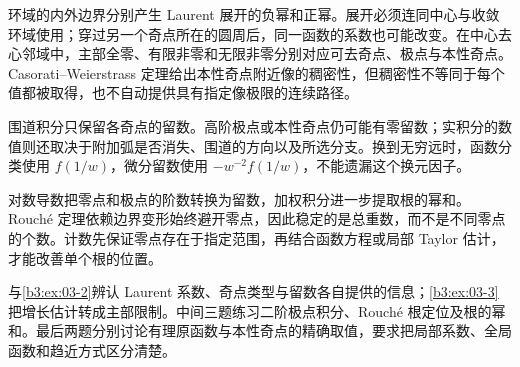 




\begin{chaptersummary}
环域的内外边界分别产生 Laurent 展开的负幂和正幂。展开必须连同中心与收敛环域使用；穿过另一个奇点所在的圆周后，同一函数的系数也可能改变。在中心去心邻域中，主部全零、有限非零和无限非零分别对应可去奇点、极点与本性奇点。Casorati--Weierstrass 定理给出本性奇点附近像的稠密性，但稠密性不等同于每个值都被取得，也不自动提供具有指定像极限的连续路径。

\ProseParagraphBreak

围道积分只保留各奇点的留数。高阶极点或本性奇点仍可能有零留数；实积分的数值则还取决于附加弧是否消失、围道的方向以及所选分支。换到无穷远时，函数分类使用 \(f(1/w)\)，微分留数使用 \(-w^{-2}f(1/w)\)，不能遗漏这个换元因子。

\ProseParagraphBreak

对数导数把零点和极点的阶数转换为留数，加权积分进一步提取根的幂和。Rouché 定理依赖边界变形始终避开零点，因此稳定的是总重数，而不是不同零点的个数。计数先保证零点存在于指定范围，再结合函数方程或局部 Taylor 估计，才能改善单个根的位置。
\end{chaptersummary}

\BookExercises

与\cref{b3:ex:03-2}辨认 Laurent 系数、奇点类型与留数各自提供的信息；\cref{b3:ex:03-3}把增长估计转成主部限制。中间三题练习二阶极点积分、Rouché 根定位及根的幂和。最后两题分别讨论有理原函数与本性奇点的精确取值，要求把局部系数、全局函数和趋近方式区分清楚。


